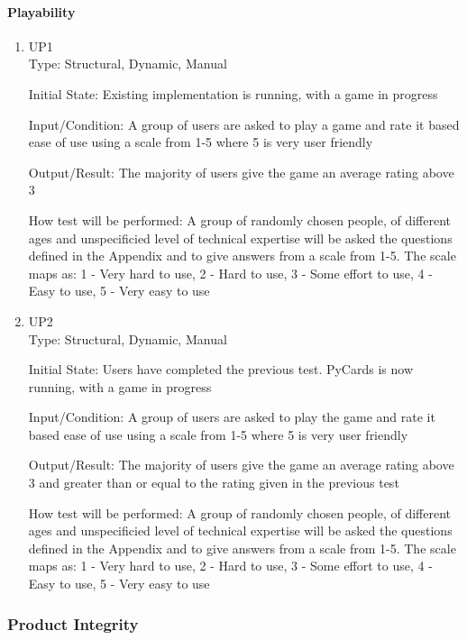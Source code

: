 \documentclass[12pt, titlepage]{article}
\begin{document}
	\paragraph{Playability}
	\begin{enumerate}
		\item{UP1\\}
		Type: Structural, Dynamic, Manual
		
		Initial State: Existing implementation is running, with a game in progress
		
		Input/Condition: A group of users are asked to play a game and rate it based
		ease of use using a scale from 1-5 where 5 is very user friendly
		
		Output/Result: The majority of users give the game an average rating above 3
		
		How test will be performed: A group of randomly chosen people, of different
		ages and unspecificied level of technical expertise will be asked the
		questions defined in the Appendix and to give answers
		from a scale from 1-5. The scale maps as: 1 - Very hard to use, 2 - Hard to
		use, 3 - Some effort to use, 4 - Easy to use, 5 - Very easy to use	

		\item{UP2\\}
		Type: Structural, Dynamic, Manual
		
		Initial State: Users have completed the previous test. PyCards is now running,
		with a game in progress
		
		Input/Condition: A group of users are asked to play the game and rate it based
		ease of use using a scale from 1-5 where 5 is very user friendly
		
		Output/Result: The majority of users give the game an average rating above 3
		and greater than or equal to the rating given in the previous test
		
		How test will be performed: A group of randomly chosen people, of different
		ages and unspecificied level of technical expertise will be asked the
		questions defined in the Appendix and to give answers
		from a scale from 1-5. The scale maps as: 1 - Very hard to use, 2 - Hard to
		use, 3 - Some effort to use, 4 - Easy to use, 5 - Very easy to use		
	\end{enumerate}

	\subsubsection{Product Integrity}
\end{document}
